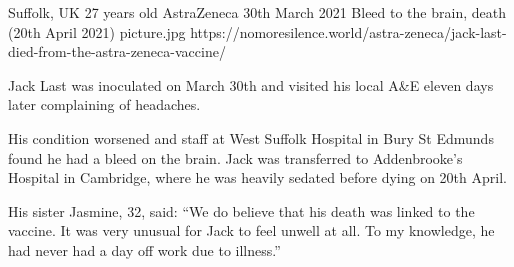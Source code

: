 {Suffolk, UK}
{27 years old}
{AstraZeneca}
{30th March 2021}
{Bleed to the brain, death (20th April 2021)}
{picture.jpg}
{https://nomoresilence.world/astra-zeneca/jack-last-died-from-the-astra-zeneca-vaccine/}
{

Jack Last was inoculated on March 30th and visited his local A\&E eleven days
later complaining of headaches.

His condition worsened and staff at West Suffolk Hospital in Bury St Edmunds
found he had a bleed on the brain. Jack was transferred to Addenbrooke’s
Hospital in Cambridge, where he was heavily sedated before dying on 20th April.

His sister Jasmine, 32, said: “We do believe that his death was linked to the
vaccine. It was very unusual for Jack to feel unwell at all. To my knowledge, he
had never had a day off work due to illness.”

}
